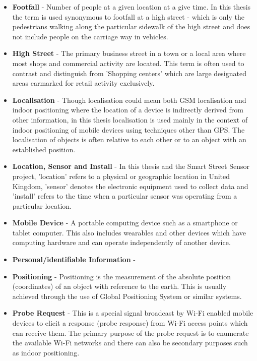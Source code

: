 \begin{itemize}
  \item \textbf{Footfall} - Number of people at a given location at a give time. In this thesis the term is used synonymous to footfall at a high street - which is only the pedestrians walking along the particular sidewalk of the high street and does not include people on the carriage way in vehicles.

  \item \textbf{High Street} - The primary business street in a town or a local area where most shops and commercial activity are located. This term is often used to contrast and distinguish from 'Shopping centers' which are large designated areas earmarked for retail activity exclusively.
    
  \item \textbf{Localisation} - Though localisation could mean both GSM localisation and indoor positioning where the location of a device is indirectly derived from other information, in this thesis localisation is used mainly in the context of indoor positioning of mobile devices using techniques other than GPS. The localisation of objects is often relative to each other or to an object with an established position.
    
  \item \textbf{Location, Sensor and Install} - In this thesis and the Smart Street Sensor project, 'location' refers to a physical or geographic location in United Kingdom, 'sensor' denotes the electronic equipment used to collect data and 'install' refers to the time when a particular sensor was operating from a particular location.
    
  \item \textbf{Mobile Device} - A portable computing device such as a smartphone or tablet computer. This also includes wearables and other devices which have computing hardware and can operate independently of another device.
    
  \item \textbf{Personal/identifiable Information} - 
    
  \item \textbf{Positioning} - Positioning is the measurement of the absolute position (coordinates) of an object with reference to the earth. This is usually achieved through the use of Global Positioning System or similar systems.

  \item \textbf{Probe Request} - This is a special signal broadcast by Wi-Fi enabled mobile devices to elicit a response (probe response) from Wi-Fi access points which can receive them. The primary purpose of the probe request is to enumerate the available Wi-Fi networks and there can also be secondary purposes such as indoor positioning.


\end{itemize}
